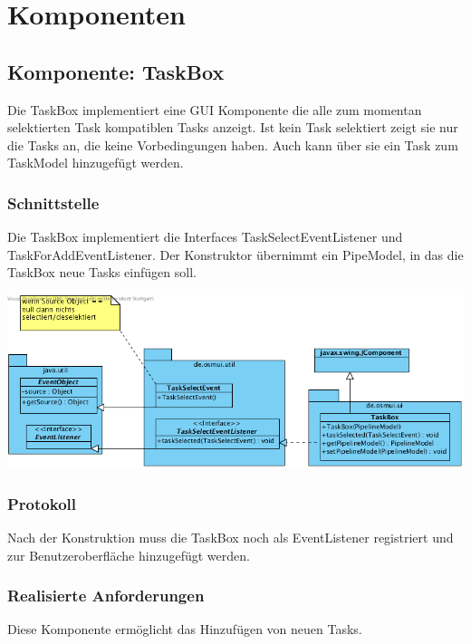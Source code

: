 \documentclass[a4paper,12pt]{scrartcl}
\begin{document}
\section{Komponenten}
\subsection{Komponente: TaskBox}
Die TaskBox implementiert eine GUI Komponente die alle zum momentan selektierten Task kompatiblen Tasks anzeigt. Ist kein Task selektiert zeigt sie nur die Tasks an, die keine Vorbedingungen haben. Auch kann über sie ein Task zum TaskModel hinzugefügt werden.
\subsubsection{Schnittstelle}
Die TaskBox implementiert die Interfaces TaskSelectEventListener und TaskForAddEventListener. Der  Konstruktor übernimmt ein PipeModel, in das die TaskBox neue Tasks einfügen soll. 
\begin{center}
\includegraphics[width=17cm]{Schnittstelle_Taskbox.png}
\end{center}
\subsubsection{Protokoll}
Nach der Konstruktion muss die TaskBox noch als EventListener registriert und zur Benutzeroberfläche hinzugefügt werden.

\subsubsection{Realisierte Anforderungen}
Diese Komponente ermöglicht das Hinzufügen von neuen Tasks.
\end{document}
